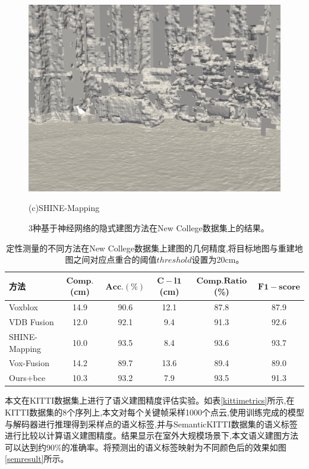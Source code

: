 \begin{figure}[htbp]
\begin{minipage}{0.5\linewidth}
        \includegraphics[width=1\linewidth]{figures/ncd_1_shine.png}
        \caption*{(c)SHINE-Mapping}
        \end{minipage}
    \caption{3种基于神经网络的隐式建图方法在New College数据集上的结果。}\label{ncdresult}
\end{figure}

\begin{table}[htbp]
    \centering
    \caption{定性测量的不同方法在New College数据集上建图的几何精度,将目标地图与重建地图之间对应点重合的阈值$threshold$设置为20cm。}\label{ncdmetric}
    \begin{tabular}[htbp]{llccccc}
        \toprule
        \multicolumn{2}{l}{方法} & $\mathbf{Comp.}$(cm) & $\mathbf{Acc.}(\%)$ & $\mathbf{C-l1}$(cm) &  $\mathbf{Comp. Ratio}$(\%) &$\mathbf{F1-score}$\\
        \midrule
        \multicolumn{2}{l}{Voxblox} & 14.9 & 90.6 &12.1 &87.8&87.9\\
        \multicolumn{2}{l}{VDB Fusion} & 12.0&92.1&9.4&91.3&92.6 \\
        \multicolumn{2}{l}{SHINE-Mapping} & 10.0&93.5&8.4&93.6&93.7 \\
        \multicolumn{2}{l}{Vox-Fusion} & 14.2 & 89.7& 13.6&89.4&89.0\\
        \midrule
        \multicolumn{2}{l}{Ours+bce} &10.3& 93.2 & 7.9 &93.5&91.3\\
        \bottomrule
    \end{tabular}
\end{table}
本文在KITTI数据集上进行了语义建图精度评估实验。如表\ref{kittimetrics}所示,在KITTI数据集的8个序列上,本文对每个关键帧采样1000个点云,使用训练完成的模型与解码器进行推理得到采样点的语义标签,并与SemanticKITTI数据集的语义标签进行比较以计算语义建图精度。结果显示在室外大规模场景下,本文语义建图方法可以达到约90\%的准确率。将预测出的语义标签映射为不同颜色后的效果如图\ref{semresult}所示。

